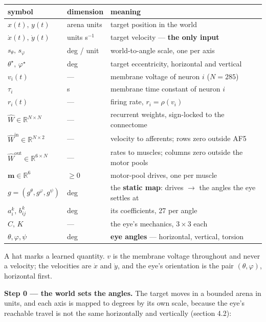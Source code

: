 \documentclass[10pt]{article}
\begin{document}
\begin{center}\small
\begin{tabularx}{\textwidth}{>{\raggedright\arraybackslash}X>{\raggedright\arraybackslash}X>{\raggedright\arraybackslash}X}\toprule
symbol & dimension & meaning \\\midrule
$x(t),\,y(t)$ & arena units & target position in the world \\
$\dot x(t),\,\dot y(t)$ & units s$^{-1}$ & target velocity --- \textbf{the only input} \\
$s_\theta,\,s_\varphi$ & deg / unit & world-to-angle scale, one per axis \\
$\theta^{\star},\,\varphi^{\star}$ & deg & target eccentricity, horizontal and vertical \\
$v_i(t)$ & --- & membrane voltage of neuron $i$ ($N=285$) \\
$\tau_i$ & s & membrane time constant of neuron $i$ \\
$r_i(t)$ & --- & firing rate, $r_i=\rho(v_i)$ \\
$\hat W \in \mathbb{R}^{N\times N}$ & --- & recurrent weights, sign-locked to the connectome \\
$\hat W^{\mathrm{in}} \in \mathbb{R}^{N\times 2}$ & --- & velocity to afferents; rows zero outside AF5 \\
$\hat W^{\mathrm{out}} \in \mathbb{R}^{6\times N}$ & --- & rates to muscles; columns zero outside the motor pools \\
$\mathbf{m}\in\mathbb{R}^{6}$ & $\ge 0$ & motor-pool drives, one per muscle \\
$g=(g^{\theta},g^{\varphi},g^{\psi})$ & deg & the \textbf{static map}: drives $\to$ the angles the eye settles at \\
$a^{k}_i,\,b^{k}_{ij}$ & deg & its coefficients, 27 per angle \\
$C,\,K$ & --- & the eye's mechanics, $3\times3$ each \\
$\theta,\varphi,\psi$ & deg & \textbf{eye angles} --- horizontal, vertical, torsion \\
\bottomrule\end{tabularx}\end{center}

A hat marks a learned quantity. $v$ is the membrane voltage throughout and never a velocity;
the velocities are $\dot x$ and $\dot y$, and the eye's orientation is the pair
$(\theta,\varphi)$, horizontal first.

\textbf{Step 0 --- the world sets the angles.} The target moves in a bounded arena in units,
and each axis is mapped to degrees by its own scale, because the eye's reachable travel is
not the same horizontally and vertically (section 4.2):
\end{document}
